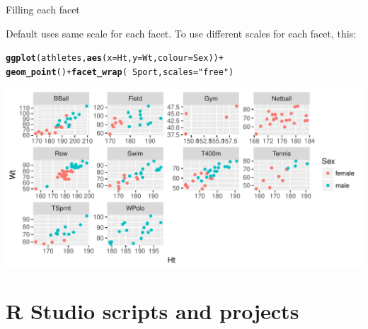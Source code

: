 \documentclass[unknownkeysallowed]{beamer}\usepackage[]{graphicx}\usepackage[]{color}
\makeatletter
\def\maxwidth{ %
  \ifdim\Gin@nat@width>\linewidth
    \linewidth
  \else
    \Gin@nat@width
  \fi
}
\newcommand{\hlstr}[1]{\textcolor[rgb]{0.192,0.494,0.8}{#1}}%
\newcommand{\hlopt}[1]{\textcolor[rgb]{0,0,0}{#1}}%
\newcommand{\hlstd}[1]{\textcolor[rgb]{0.345,0.345,0.345}{#1}}%
\newcommand{\hlkwc}[1]{\textcolor[rgb]{0.333,0.667,0.333}{#1}}%
\newcommand{\hlkwd}[1]{\textcolor[rgb]{0.737,0.353,0.396}{\textbf{#1}}}%
\newenvironment{kframe}{%
 \def\at@end@of@kframe{}%
 \ifinner\ifhmode%
  \def\at@end@of@kframe{\end{minipage}}%
  \begin{minipage}{\columnwidth}%
 \fi\fi%
 \def\FrameCommand##1{\hskip\@totalleftmargin \hskip-\fboxsep
 \colorbox{shadecolor}{##1}\hskip-\fboxsep
     \hskip-\linewidth \hskip-\@totalleftmargin \hskip\columnwidth}%
 \MakeFramed {\advance\hsize-\width
   \@totalleftmargin\z@ \linewidth\hsize
   \@setminipage}}%
 {\par\unskip\endMakeFramed%
 \at@end@of@kframe}
\newenvironment{knitrout}{}{} %
\makeatother
\begin{document}
\begin{frame}[fragile]{Filling each facet}
  
  Default uses same scale for each facet. To use different scales for
  each facet, this:
  
\begin{knitrout}
\color{fgcolor}\begin{kframe}
\begin{alltt}
\hlkwd{ggplot}\hlstd{(athletes,}\hlkwd{aes}\hlstd{(}\hlkwc{x}\hlstd{=Ht,}\hlkwc{y}\hlstd{=Wt,}\hlkwc{colour}\hlstd{=Sex))}\hlopt{+}
  \hlkwd{geom_point}\hlstd{()}\hlopt{+}\hlkwd{facet_wrap}\hlstd{(}\hlopt{~}\hlstd{Sport,}\hlkwc{scales}\hlstd{=}\hlstr{"free"}\hlstd{)}
\end{alltt}
\end{kframe}
\includegraphics[width=\maxwidth]{figure/unnamed-chunk-33-1} 

\end{knitrout}
  
  
\end{frame}



\section{R Studio scripts and projects}

\frame{\sectionpage}
\end{document}
